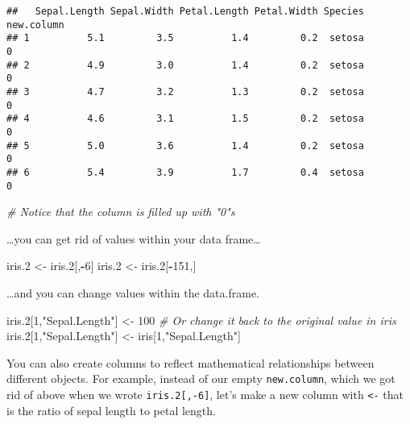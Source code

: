 \documentclass[]{article}
\newenvironment{Shaded}{\begin{snugshade}}{\end{snugshade}}
\newcommand{\DecValTok}[1]{\textcolor[rgb]{0.00,0.00,0.81}{#1}}
\newcommand{\StringTok}[1]{\textcolor[rgb]{0.31,0.60,0.02}{#1}}
\newcommand{\CommentTok}[1]{\textcolor[rgb]{0.56,0.35,0.01}{\textit{#1}}}
\newcommand{\OperatorTok}[1]{\textcolor[rgb]{0.81,0.36,0.00}{\textbf{#1}}}
\newcommand{\NormalTok}[1]{#1}
\begin{document}
\begin{verbatim}
##   Sepal.Length Sepal.Width Petal.Length Petal.Width Species new.column
## 1          5.1         3.5          1.4         0.2  setosa          0
## 2          4.9         3.0          1.4         0.2  setosa          0
## 3          4.7         3.2          1.3         0.2  setosa          0
## 4          4.6         3.1          1.5         0.2  setosa          0
## 5          5.0         3.6          1.4         0.2  setosa          0
## 6          5.4         3.9          1.7         0.4  setosa          0
\end{verbatim}

\begin{Shaded}
\begin{Highlighting}[]
\CommentTok{# Notice that the column is filled up with "0"s}
\end{Highlighting}
\end{Shaded}

\ldots{}you can get rid of values within your data frame\ldots{}

\begin{Shaded}
\begin{Highlighting}[]
\NormalTok{iris.}\DecValTok{2}\NormalTok{ <-}\StringTok{ }\NormalTok{iris.}\DecValTok{2}\NormalTok{[,}\OperatorTok{-}\DecValTok{6}\NormalTok{]}
\NormalTok{iris.}\DecValTok{2}\NormalTok{ <-}\StringTok{ }\NormalTok{iris.}\DecValTok{2}\NormalTok{[}\OperatorTok{-}\DecValTok{151}\NormalTok{,]}
\end{Highlighting}
\end{Shaded}

\ldots{}and you can change values within the data.frame.

\begin{Shaded}
\begin{Highlighting}[]
\NormalTok{iris.}\DecValTok{2}\NormalTok{[}\DecValTok{1}\NormalTok{,}\StringTok{"Sepal.Length"}\NormalTok{] <-}\StringTok{ }\DecValTok{100}
\CommentTok{# Or change it back to the original value in iris}
\NormalTok{iris.}\DecValTok{2}\NormalTok{[}\DecValTok{1}\NormalTok{,}\StringTok{"Sepal.Length"}\NormalTok{] <-}\StringTok{ }\NormalTok{iris[}\DecValTok{1}\NormalTok{,}\StringTok{"Sepal.Length"}\NormalTok{]}
\end{Highlighting}
\end{Shaded}

You can also create columns to reflect mathematical relationships
between different objects. For example, instead of our empty
\texttt{new.column}, which we got rid of above when we wrote
\texttt{iris.2{[},-6{]}}, let's make a new column with
\texttt{\textless{}-} that is the ratio of sepal length to petal length.
\end{document}
